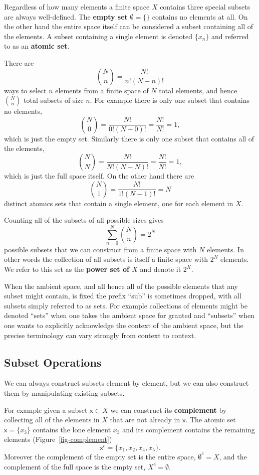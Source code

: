 \documentclass[
  letterpaper,
  DIV=11,
  numbers=noendperiod]{scrartcl}
\begin{document}
Regardless of how many elements a finite space \(X\) contains three
special subsets are always well-defined. The \textbf{empty set}
\(\emptyset = \{\}\) contains no elements at all. On the other hand the
entire space itself can be considered a subset containing all of the
elements. A subset containing a single element is denoted
\(\{ x_{n} \}\) and referred to as an \textbf{atomic set}.

There are \[
{N \choose n} = \frac{ N! }{ n! (N - n)!}
\] ways to select \(n\) elements from a finite space of \(N\) total
elements, and hence \({N \choose n}\) total subsets of size \(n\). For
example there is only one subset that contains no elements, \[
{N \choose 0} = \frac{ N! }{ 0! (N - 0)!} = \frac{ N! }{ N! } = 1,
\] which is just the empty set. Similarly there is only one subset that
contains all of the elements, \[
{N \choose N} = \frac{ N! }{ N! (N - N)!} = \frac{ N! }{ N! } = 1,
\] which is just the full space itself. On the other hand there are \[
{N \choose 1} = \frac{ N! }{ 1! (N - 1)!} = N
\] distinct atomics sets that contain a single element, one for each
element in \(X\).

Counting all of the subsets of all possible sizes gives \[
\sum_{n = 0}^{N} {N \choose n} = 2^{N}
\] possible subsets that we can construct from a finite space with \(N\)
elements. In other words the collection of all subsets is itself a
finite space with \(2^{N}\) elements. We refer to this set as the
\textbf{power set of \(X\)} and denote it \(2^{X}\).

When the ambient space, and all hence all of the possible elements that
any subset might contain, is fixed the prefix ``sub'' is sometimes
dropped, with all subsets simply referred to as sets. For example
collections of elements might be denoted ``sets'' when one takes the
ambient space for granted and ``subsets'' when one wants to explicitly
acknowledge the context of the ambient space, but the precise
terminology can vary strongly from context to context.

\hypertarget{subset-operations}{%
\subsection{Subset Operations}\label{subset-operations}}

We can always construct subsets element by element, but we can also
construct them by manipulating existing subsets.

For example given a subset \(\mathsf{x} \subset X\) we can construct its
\textbf{complement} by collecting all of the elements in \(X\) that are
not already in \(\mathsf{x}\). The atomic set
\(\mathsf{x} = \{ x_{3} \}\) contains the lone element \(x_3\) and its
complement contains the remaining elements (Figure~\ref{fig-complement})
\[
\mathsf{x}^{c} = \{ x_{1}, x_{2}, x_{4}, x_{5} \}.
\] Moreover the complement of the empty set is the entire space,
\(\emptyset^{c} = X\), and the complement of the full space is the empty
set, \(X^{c} = \emptyset\).
\end{document}

